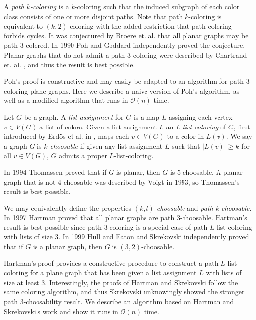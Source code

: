 \documentclass[letterpaper, 12pt]{article}
\theoremstyle{definition}
\theoremstyle{definition}
\theoremstyle{thm}
\theoremstyle{definition}
\begin{document}
A \textit{path $k$-coloring} is a
$k$-coloring such that the induced subgraph of each color class consists of one
or more disjoint paths. Note that path $k$-coloring is equivalent to
$(k,2)$-coloring with the added restriction that path coloring forbids cycles.
It was conjectured by Broere et. al. \cite{broere} that all planar graphs may
be path $3$-colored. In 1990 Poh \cite{poh} and Goddard \cite{goddard}
independently proved the conjecture. Planar graphs that do not admit a path $3$-coloring
were described by Chartrand et. al. \cite{kronk}, and thus the result is best possible.

Poh's proof is constructive and may easily be adapted to an algorithm for path
$3$-coloring plane graphs. Here we describe a naive version of Poh's algorithm,
as well as a modified algorithm that runs in $\mathcal{O}(n)$ time.

Let $G$ be a graph. A \textit{list assignment} for $G$ is a map $L$ assigning
each vertex $v\in V(G)$ a list of colors. Given a list assignment $L$ an
\textit{$L$-list-coloring} of $G$, first introduced
by Erd{\"o}s et al. in \cite{erdos}, maps each $v\in V(G)$ to a color in $L(v)$.
We say a graph $G$ is \textit{$k$-choosable} if given any list assignment $L$ such that
$|L(v)|\ge k$ for all $v\in V(G)$, $G$ admits a proper $L$-list-coloring.

In 1994 Thomassen \cite{thomassen} proved that if $G$ is planar, then $G$ is
$5$-choosable. A planar graph that is not $4$-choosable was
described by Voigt \cite{voigt} in 1993, so Thomassen's result is best possible.

We may equivalently define the properties \textit{$(k,l)$-choosable} and
\textit{path $k$-choosable}. In 1997 Hartman \cite{hartman} proved that all
planar graphs are path $3$-choosable. Hartman's result is best possible since
path $3$-coloring is a special case of path $L$-list-coloring with lists of size
$3$. In 1999 Hull and Eaton \cite{hull} and Skrekovski \cite{skrekovski}
independently proved that if $G$ is a planar graph, then $G$ is
$(3,2)$-choosable.

Hartman's proof provides a constructive procedure to construct a path
$L$-list-coloring for a plane graph that has been given a list assignment $L$
with lists of size at least $3$. Interestingly, the proofs of Hartman and
Skrekovski follow the same coloring algorithm, and thus Skrekovski unknowingly
showed the stronger path $3$-choosability result. We describe an algorithm
based on Hartman and Skrekovski's work and show it runs in $\mathcal{O}(n)$
time.
\end{document}
